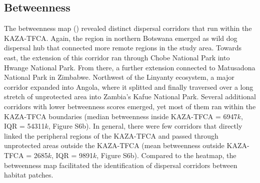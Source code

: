\documentclass[abstract=on,10pt,a4paper,bibliography=totocnumbered]{article}
\begin{document}
\subsection{Betweenness}
The betweenness map () revealed distinct dispersal corridors
that run within the KAZA-TFCA. Again, the region in northern Botswana emerged
as wild dog dispersal hub that connected more remote regions in the study area.
Towards east, the extension of this corridor ran through Chobe National Park
into Hwange National Park. From there, a further extension connected to
Matusadona National Park in Zimbabwe. Northwest of the Linyanty ecosystem, a
major corridor expanded into Angola, where it splitted and finally traversed
over a long stretch of unprotected area into Zambia's Kafue National Park.
Several additional corridors with lower betweenness scores emerged, yet most of
them ran within the KAZA-TFCA boundaries (median betweenness inside KAZA-TFCA =
6947\(k\), IQR = 54311\(k\), Figure S6b). In general, there were few corridors
that directly linked the peripheral regions of the KAZA-TFCA and passed through
unprotected areas outside the KAZA-TFCA (mean betweenness outside KAZA-TFCA =
2685\(k\), IQR = 9891\(k\), Figure S6b). Compared to the heatmap, the
betweenness map facilitated the identification of dispersal corridors between
habitat patches.

\end{document}
